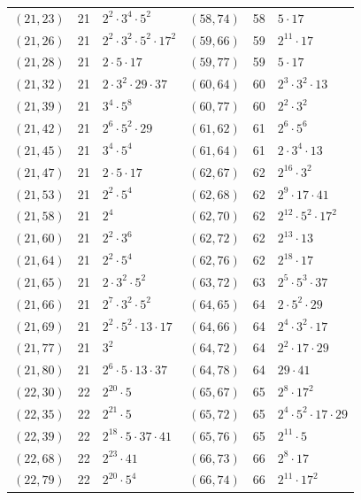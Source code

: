 \documentclass[11pt]{article}
\begin{document}
\begin{longtable}{@{}lrl@{\qquad}lrl@{}}
$(21,23)$ & 21 & $2^{2}\cdot 3^{4}\cdot 5^{2}$ & $(58,74)$ & 58 & $5\cdot 17$\\
$(21,26)$ & 21 & $2^{2}\cdot 3^{2}\cdot 5^{2}\cdot 17^{2}$ & $(59,66)$ & 59 & $2^{11}\cdot 17$\\
$(21,28)$ & 21 & $2\cdot 5\cdot 17$ & $(59,77)$ & 59 & $5\cdot 17$\\
$(21,32)$ & 21 & $2\cdot 3^{2}\cdot 29\cdot 37$ & $(60,64)$ & 60 & $2^{3}\cdot 3^{2}\cdot 13$\\
$(21,39)$ & 21 & $3^{4}\cdot 5^{8}$ & $(60,77)$ & 60 & $2^{2}\cdot 3^{2}$\\
$(21,42)$ & 21 & $2^{6}\cdot 5^{2}\cdot 29$ & $(61,62)$ & 61 & $2^{6}\cdot 5^{6}$\\
$(21,45)$ & 21 & $3^{4}\cdot 5^{4}$ & $(61,64)$ & 61 & $2\cdot 3^{4}\cdot 13$\\
$(21,47)$ & 21 & $2\cdot 5\cdot 17$ & $(62,67)$ & 62 & $2^{16}\cdot 3^{2}$\\
$(21,53)$ & 21 & $2^{2}\cdot 5^{4}$ & $(62,68)$ & 62 & $2^{9}\cdot 17\cdot 41$\\
$(21,58)$ & 21 & $2^{4}$ & $(62,70)$ & 62 & $2^{12}\cdot 5^{2}\cdot 17^{2}$\\
$(21,60)$ & 21 & $2^{2}\cdot 3^{6}$ & $(62,72)$ & 62 & $2^{13}\cdot 13$\\
$(21,64)$ & 21 & $2^{2}\cdot 5^{4}$ & $(62,76)$ & 62 & $2^{18}\cdot 17$\\
$(21,65)$ & 21 & $2\cdot 3^{2}\cdot 5^{2}$ & $(63,72)$ & 63 & $2^{5}\cdot 5^{3}\cdot 37$\\
$(21,66)$ & 21 & $2^{7}\cdot 3^{2}\cdot 5^{2}$ & $(64,65)$ & 64 & $2\cdot 5^{2}\cdot 29$\\
$(21,69)$ & 21 & $2^{2}\cdot 5^{2}\cdot 13\cdot 17$ & $(64,66)$ & 64 & $2^{4}\cdot 3^{2}\cdot 17$\\
$(21,77)$ & 21 & $3^{2}$ & $(64,72)$ & 64 & $2^{2}\cdot 17\cdot 29$\\
$(21,80)$ & 21 & $2^{6}\cdot 5\cdot 13\cdot 37$ & $(64,78)$ & 64 & $29\cdot 41$\\
$(22,30)$ & 22 & $2^{20}\cdot 5$ & $(65,67)$ & 65 & $2^{8}\cdot 17^{2}$\\
$(22,35)$ & 22 & $2^{21}\cdot 5$ & $(65,72)$ & 65 & $2^{4}\cdot 5^{2}\cdot 17\cdot 29$\\
$(22,39)$ & 22 & $2^{18}\cdot 5\cdot 37\cdot 41$ & $(65,76)$ & 65 & $2^{11}\cdot 5$\\
$(22,68)$ & 22 & $2^{23}\cdot 41$ & $(66,73)$ & 66 & $2^{8}\cdot 17$\\
$(22,79)$ & 22 & $2^{20}\cdot 5^{4}$ & $(66,74)$ & 66 & $2^{11}\cdot 17^{2}$\\

\end{longtable}
\end{document}

